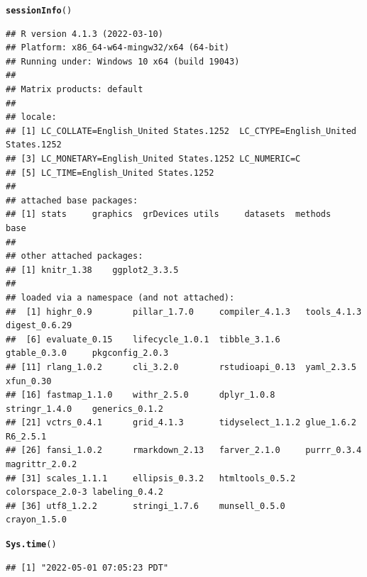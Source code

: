 \documentclass{article}\usepackage[]{graphicx}\usepackage[]{color}
\makeatletter
\newcommand{\hlstd}[1]{\textcolor[rgb]{0.345,0.345,0.345}{#1}}%
\newcommand{\hlkwd}[1]{\textcolor[rgb]{0.737,0.353,0.396}{\textbf{#1}}}%
\newenvironment{kframe}{%
 \def\at@end@of@kframe{}%
 \ifinner\ifhmode%
  \def\at@end@of@kframe{\end{minipage}}%
  \begin{minipage}{\columnwidth}%
 \fi\fi%
 \def\FrameCommand##1{\hskip\@totalleftmargin \hskip-\fboxsep
 \colorbox{shadecolor}{##1}\hskip-\fboxsep
     \hskip-\linewidth \hskip-\@totalleftmargin \hskip\columnwidth}%
 \MakeFramed {\advance\hsize-\width
   \@totalleftmargin\z@ \linewidth\hsize
   \@setminipage}}%
 {\par\unskip\endMakeFramed%
 \at@end@of@kframe}
\newenvironment{knitrout}{}{} %
\makeatother
\begin{document}
\begin{knitrout}
\color{fgcolor}\begin{kframe}
\begin{alltt}
\hlkwd{sessionInfo}\hlstd{()}
\end{alltt}
\begin{verbatim}
## R version 4.1.3 (2022-03-10)
## Platform: x86_64-w64-mingw32/x64 (64-bit)
## Running under: Windows 10 x64 (build 19043)
## 
## Matrix products: default
## 
## locale:
## [1] LC_COLLATE=English_United States.1252  LC_CTYPE=English_United States.1252   
## [3] LC_MONETARY=English_United States.1252 LC_NUMERIC=C                          
## [5] LC_TIME=English_United States.1252    
## 
## attached base packages:
## [1] stats     graphics  grDevices utils     datasets  methods   base     
## 
## other attached packages:
## [1] knitr_1.38    ggplot2_3.3.5
## 
## loaded via a namespace (and not attached):
##  [1] highr_0.9        pillar_1.7.0     compiler_4.1.3   tools_4.1.3      digest_0.6.29   
##  [6] evaluate_0.15    lifecycle_1.0.1  tibble_3.1.6     gtable_0.3.0     pkgconfig_2.0.3 
## [11] rlang_1.0.2      cli_3.2.0        rstudioapi_0.13  yaml_2.3.5       xfun_0.30       
## [16] fastmap_1.1.0    withr_2.5.0      dplyr_1.0.8      stringr_1.4.0    generics_0.1.2  
## [21] vctrs_0.4.1      grid_4.1.3       tidyselect_1.1.2 glue_1.6.2       R6_2.5.1        
## [26] fansi_1.0.2      rmarkdown_2.13   farver_2.1.0     purrr_0.3.4      magrittr_2.0.2  
## [31] scales_1.1.1     ellipsis_0.3.2   htmltools_0.5.2  colorspace_2.0-3 labeling_0.4.2  
## [36] utf8_1.2.2       stringi_1.7.6    munsell_0.5.0    crayon_1.5.0
\end{verbatim}
\begin{alltt}
\hlkwd{Sys.time}\hlstd{()}
\end{alltt}
\begin{verbatim}
## [1] "2022-05-01 07:05:23 PDT"
\end{verbatim}
\end{kframe}
\end{knitrout}
\end{document}
